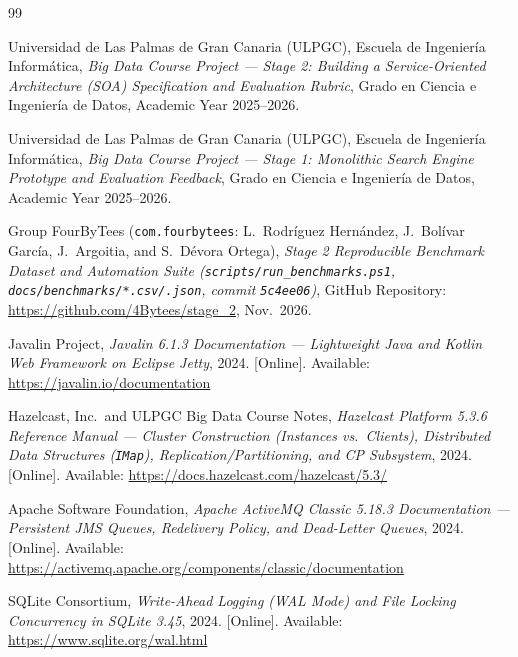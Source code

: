 \documentclass[10pt,a4paper]{article}
\begin{document}
\begin{thebibliography}{99}

Universidad de Las Palmas de Gran Canaria (ULPGC), Escuela de Ingenier\'ia Inform\'atica,
\emph{Big Data Course Project --- Stage 2: Building a Service-Oriented Architecture (SOA) Specification and Evaluation Rubric},
Grado en Ciencia e Ingenier\'ia de Datos, Academic Year 2025--2026.

Universidad de Las Palmas de Gran Canaria (ULPGC), Escuela de Ingenier\'ia Inform\'atica,
\emph{Big Data Course Project --- Stage 1: Monolithic Search Engine Prototype and Evaluation Feedback},
Grado en Ciencia e Ingenier\'ia de Datos, Academic Year 2025--2026.

Group FourByTees (\texttt{com.fourbytees}: L.~Rodr\'iguez Hern\'andez, J.~Bol\'ivar Garc\'ia, J.~Argoitia, and S.~D\'evora Ortega),
\emph{Stage 2 Reproducible Benchmark Dataset and Automation Suite (\texttt{scripts/run\_benchmarks.ps1}, \texttt{docs/benchmarks/*.csv/.json}, commit \texttt{5c4ee06})},
GitHub Repository: \url{https://github.com/4Bytees/stage_2}, Nov.\ 2026.

Javalin Project,
\emph{Javalin 6.1.3 Documentation --- Lightweight Java and Kotlin Web Framework on Eclipse Jetty},
2024. [Online]. Available: \url{https://javalin.io/documentation}

Hazelcast, Inc.\ and ULPGC Big Data Course Notes,
\emph{Hazelcast Platform 5.3.6 Reference Manual --- Cluster Construction (Instances vs.\ Clients), Distributed Data Structures (\texttt{IMap}), Replication/Partitioning, and CP Subsystem},
2024. [Online]. Available: \url{https://docs.hazelcast.com/hazelcast/5.3/}

Apache Software Foundation,
\emph{Apache ActiveMQ Classic 5.18.3 Documentation --- Persistent JMS Queues, Redelivery Policy, and Dead-Letter Queues},
2024. [Online]. Available: \url{https://activemq.apache.org/components/classic/documentation}

SQLite Consortium,
\emph{Write-Ahead Logging (WAL Mode) and File Locking Concurrency in SQLite 3.45},
2024. [Online]. Available: \url{https://www.sqlite.org/wal.html}


\end{thebibliography}
\end{document}
